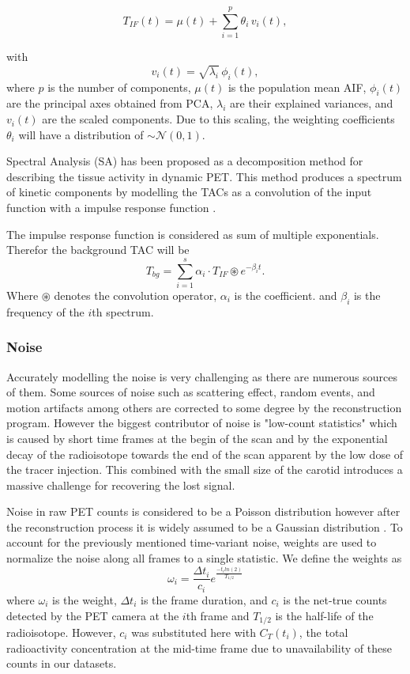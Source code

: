 \begin{equation}
	T_{IF}(t) = \mu(t) + \sum_{i=1}^p \theta_i\,v_i(t),
\end{equation}

with
\[
	v_i(t) = \sqrt{\lambda_i}\,\phi_i(t),
\]
where $p$ is the number of components, \(\mu(t)\) is the population mean AIF, \(\phi_i(t)\) are the principal axes obtained from PCA, \(\lambda_i\) are their explained variances, and \(v_i(t)\) are the scaled components. Due to this scaling, the weighting coefficients \(\theta_i\) will have a distribution of \(\sim \mathcal{N}(0,1)\).

Spectral Analysis (SA) has been proposed as a decomposition method for describing the tissue activity in dynamic PET.
This method produces a spectrum of kinetic components by modelling the TACs as a convolution of the input function with a impulse response function \cite{TODO}.

The impulse response function is considered as sum of multiple exponentials. Therefor the background TAC will be
\[
	T_{bg} = \sum_{i=1}^s \alpha_{i} \cdot T_{IF} \circledast e^{-\beta_{i} t}.
\]
Where $\circledast$ denotes the convolution operator, \(\alpha_i\) is the coefficient. and \(\beta_i\) is the frequency of the \(i\)th spectrum.


\subsubsection{Noise}

Accurately modelling the noise is very challenging as there are numerous sources of them.
Some sources of noise such as scattering effect, random events, and motion artifacts among others are corrected to some degree by the reconstruction program.
However the biggest contributor of noise is "low-count statistics" which is caused by short time frames at the begin of the scan and by the exponential decay of the radioisotope towards the end of the scan apparent by the low dose of the tracer injection.
This combined with the small size of the carotid introduces a massive challenge for recovering the lost signal.

Noise in raw PET counts is considered to be a Poisson distribution however after the reconstruction process it is widely assumed to be a Gaussian distribution \cite{TODO}. To account for the previously mentioned time-variant noise, weights are used to normalize the noise along all frames to a single statistic. We define the weights as
\[
	\omega_{i} = \frac{\Delta t_i}{c_i} e^{\frac{-t_{i} ln(2)}{T_{1/2}}}
\]
where \(\omega_i\) is the weight, \(\Delta t_i\) is the frame duration, and \(c_i\) is the net-true counts detected by the PET camera at the \(i\)th frame and  \(T_{1/2}\) is the half-life of the radioisotope.
However, \(c_i\) was substituted here with \(C_T(t_i)\), the total radioactivity concentration at the mid-time frame due to unavailability of these counts in our datasets.

